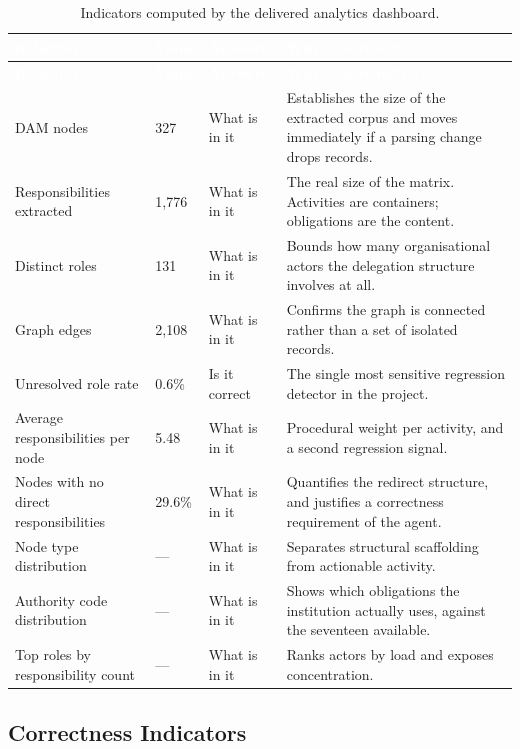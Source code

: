 \begin{longtable}{|p{}|p{}|p{}|p{}|}
\caption{Indicators computed by the delivered analytics dashboard.}\label{tab:dashkpi}\\
\hline
\rowcolor{myblue}\textcolor{white}{\textbf{Indicator}} & \textcolor{white}{\textbf{Value}} & \textcolor{white}{\textbf{Answers}} & \textcolor{white}{\textbf{Why it is reported}} \\
\hline
\endfirsthead
\hline
\rowcolor{myblue}\textcolor{white}{\textbf{Indicator}} & \textcolor{white}{\textbf{Value}} & \textcolor{white}{\textbf{Answers}} & \textcolor{white}{\textbf{Why it is reported}} \\
\hline
\endhead
DAM nodes & 327 & What is in it & Establishes the size of the extracted corpus and moves immediately if a parsing change drops records. \\ \hline
Responsibilities extracted & 1{,}776 & What is in it & The real size of the matrix. Activities are containers; obligations are the content. \\ \hline
Distinct roles & 131 & What is in it & Bounds how many organisational actors the delegation structure involves at all. \\ \hline
Graph edges & 2{,}108 & What is in it & Confirms the graph is connected rather than a set of isolated records. \\ \hline
Unresolved role rate & 0.6\% & Is it correct & The single most sensitive regression detector in the project. \\ \hline
Average responsibilities per node & 5.48 & What is in it & Procedural weight per activity, and a second regression signal. \\ \hline
Nodes with no direct responsibilities & 29.6\% & What is in it & Quantifies the redirect structure, and justifies a correctness requirement of the agent. \\ \hline
Node type distribution & --- & What is in it & Separates structural scaffolding from actionable activity. \\ \hline
Authority code distribution & --- & What is in it & Shows which obligations the institution actually uses, against the seventeen available. \\ \hline
Top roles by responsibility count & --- & What is in it & Ranks actors by load and exposes concentration. \\ \hline
\end{longtable}

\subsection{Correctness Indicators}

